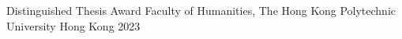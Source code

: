 

\begin{cvhonors}

  \cvhonor
    {Distinguished Thesis Award} %
    {Faculty of Humanities, The Hong Kong Polytechnic University} %
    {Hong Kong} %
    {2023} %

\end{cvhonors}




